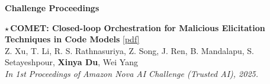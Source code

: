 \vspace{1.5mm}
\noindent \textbf{Challenge Proceedings}
\begin{enumerate}[{[}1{]},resume,leftmargin=*]

\parbox{\linewidth}{
\item\label{pub:comet}
$\star$\,{\bf COMET: Closed-loop Orchestration for Malicious Elicitation Techniques in Code Models}
\href{https://www.amazon.science/nova-ai-challenge/proceedings/comet-closed-loop-orchestration-for-malicious-elicitation-techniques-in-code-models}{{{[pdf]}}} \\
Z. Xu, T. Li, R. S. Rathnasuriya, Z. Song, J. Ren, B. Mandalapu, S. Setayeshpour, \textbf{Xinya Du}, Wei Yang \\
{\it In 1st Proceedings of Amazon Nova AI Challenge (Trusted AI), 2025.} \\
}

\end{enumerate}

